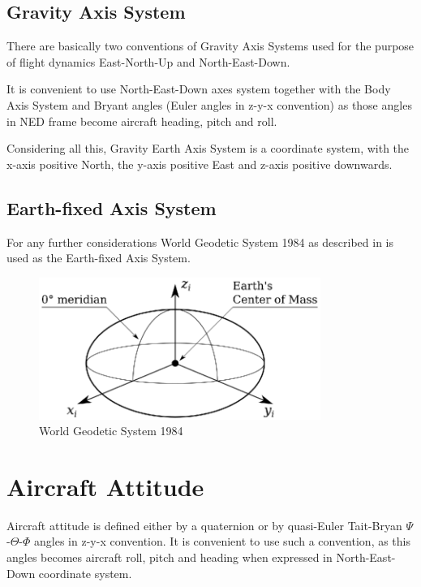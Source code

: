 \subsection{Gravity Axis System}

There are basically two conventions of Gravity Axis Systems used for the purpose of flight dynamics East-North-Up and North-East-Down.

It is convenient to use North-East-Down axes system together with the Body Axis System and Bryant angles (Euler angles in z-y-x convention) as those angles in NED frame become aircraft heading, pitch and roll.

Considering all this, Gravity Earth Axis System is a coordinate system, with the x-axis positive North, the y-axis positive East and z-axis positive downwards.

\subsection{Earth-fixed Axis System}

For any further considerations World Geodetic System 1984 as described in \cite{NIMA-TR-8350-2} is used as the Earth-fixed Axis System.

\begin{figure}
  \centering
  \includegraphics[width=260pt]{images/coordinate_system_WGS.eps}
  \caption{World Geodetic System 1984}
\end{figure}

\section{Aircraft Attitude}

Aircraft attitude is defined either by a quaternion or by quasi-Euler Tait-Bryan $\Psi$-$\Theta$-$\Phi$ angles in z-y-x convention. It is convenient to use such a convention, as this angles becomes aircraft roll, pitch and heading when expressed in North-East-Down coordinate system.


